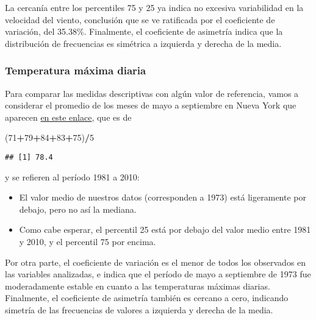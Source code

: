 \documentclass[
]{article}
\newenvironment{Shaded}{\begin{snugshade}}{\end{snugshade}}
\newcommand{\DecValTok}[1]{\textcolor[rgb]{0.00,0.00,0.81}{#1}}
\newcommand{\NormalTok}[1]{#1}
\newcommand{\OperatorTok}[1]{\textcolor[rgb]{0.81,0.36,0.00}{\textbf{#1}}}
\providecommand{\tightlist}{%
  \setlength{\itemsep}{0pt}\setlength{\parskip}{0pt}}
\begin{document}
La cercanía entre los percentiles 75 y 25 ya indica no excesiva
variabilidad en la velocidad del viento, conclusión que se ve ratificada
por el coeficiente de variación, del 35.38\%. Finalmente, el coeficiente
de asimetría indica que la distribución de frecuencias es simétrica a
izquierda y derecha de la media.

\hypertarget{temperatura-muxe1xima-diaria}{%
\subsubsection{Temperatura máxima
diaria}\label{temperatura-muxe1xima-diaria}}

Para comparar las medidas descriptivas con algún valor de referencia,
vamos a considerar el promedio de los meses de mayo a septiembre en
Nueva York que aparecen
\href{https://www.currentresults.com/Weather/New-York/Places/new-york-city-temperatures-by-month-average.php}{en
este enlace}, que es de

\begin{Shaded}
\begin{Highlighting}[]
\NormalTok{(}\DecValTok{71}\OperatorTok{+}\DecValTok{79}\OperatorTok{+}\DecValTok{84}\OperatorTok{+}\DecValTok{83}\OperatorTok{+}\DecValTok{75}\NormalTok{)}\OperatorTok{/}\DecValTok{5}
\end{Highlighting}
\end{Shaded}

\begin{verbatim}
## [1] 78.4
\end{verbatim}

y se refieren al período 1981 a 2010:

\begin{itemize}
\tightlist
\item
  El valor medio de nuestros datos (corresponden a 1973) está
  ligeramente por debajo, pero no así la mediana.
\item
  Como cabe esperar, el percentil 25 está por debajo del valor medio
  entre 1981 y 2010, y el percentil 75 por encima.
\end{itemize}

Por otra parte, el coeficiente de variación es el menor de todos los
observados en las variables analizadas, e indica que el período de mayo
a septiembre de 1973 fue moderadamente estable en cuanto a las
temperaturas máximas diarias. Finalmente, el coeficiente de asimetría
también es cercano a cero, indicando simetría de las frecuencias de
valores a izquierda y derecha de la media.
\end{document}
